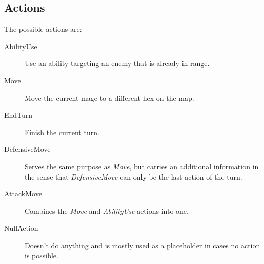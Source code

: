
\subsection{Actions}
The possible actions are:

\begin{description}
\item [AbilityUse] Use an ability targeting an enemy that is already in range.
\item [Move] Move the current mage to a different hex on the map.
\item [EndTurn] Finish the current turn.
\item [DefensiveMove] Serves the same purpose as \emph{Move}, but carries an
additional information in the sense that \emph{DefensiveMove} can only be
the last action of the turn.
\item [AttackMove] Combines the \emph{Move} and \emph{AbilityUse} actions into one.
\item [NullAction] Doesn't do anything and is mostly used as a placeholder in cases no action is possible.
\end{description}

